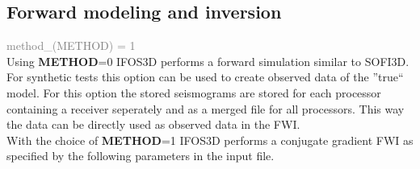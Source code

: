 \subsection{Forward modeling and inversion}
\textcolor {Gray}{method\_(METHOD) = 1}\vspace{0.1cm}\\
Using \textbf{METHOD}=0 IFOS3D performs a forward simulation similar to SOFI3D. For synthetic tests this option can be used to create observed data of the ''true`` model. For this option the stored seismograms are stored for each processor containing a receiver seperately and as a merged file for all processors. This way the data can be directly used as observed data in the FWI.\\
With the choice of \textbf{METHOD}=1 IFOS3D performs a conjugate gradient FWI as specified by the following parameters in the input file.

